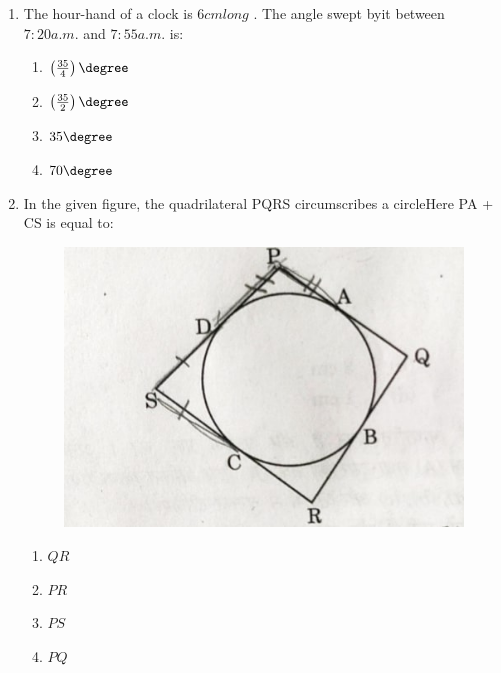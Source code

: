 \begin{enumerate}
    \item The hour-hand of a clock is $6 cm long$ . The angle swept byit between $7:20 a.m.$ and $7:55 a.m.$ is:
    \begin{enumerate}
    \item $ \left(\frac{35}{4}\right)\degree $
    \item $ \left(\frac{35}{2}\right)\degree $                                
    \item $ 35\degree $                  
    \item $ 70\degree $  
    \end{enumerate}

\item In the given figure, the quadrilateral PQRS circumscribes a circleHere PA + CS is equal to:  
\newpage
	\begin{figure}[!ht]                                    
    \centering                                            
    \includegraphics[width=\columnwidth]{figs/ct1.jpg}      
    \label{fig:image2}                                      
    \end{figure}  
    \begin{enumerate}
    \item $ QR $
    \item $ PR $                                          
    \item $ PS $                                          
    \item $ PQ $
    \end{enumerate}  




    \end{enumerate}

